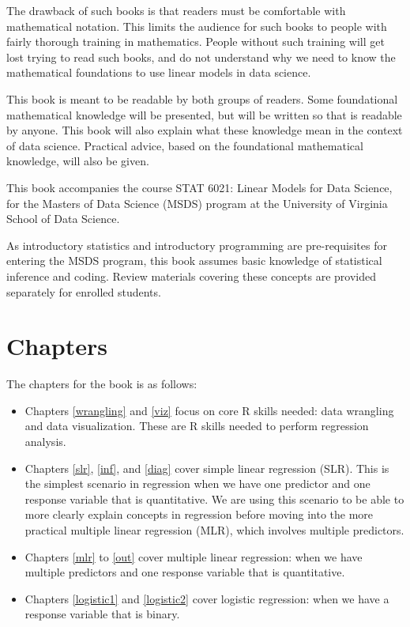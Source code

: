 \documentclass[
]{book}
\begin{document}
The drawback of such books is that readers must be comfortable with mathematical notation. This limits the audience for such books to people with fairly thorough training in mathematics. People without such training will get lost trying to read such books, and do not understand why we need to know the mathematical foundations to use linear models in data science.

This book is meant to be readable by both groups of readers. Some foundational mathematical knowledge will be presented, but will be written so that is readable by anyone. This book will also explain what these knowledge mean in the context of data science. Practical advice, based on the foundational mathematical knowledge, will also be given.

This book accompanies the course STAT 6021: Linear Models for Data Science, for the Masters of Data Science (MSDS) program at the University of Virginia School of Data Science.

As introductory statistics and introductory programming are pre-requisites for entering the MSDS program, this book assumes basic knowledge of statistical inference and coding. Review materials covering these concepts are provided separately for enrolled students.

\section*{Chapters}\label{chapters}

The chapters for the book is as follows:

\begin{itemize}
\item
  Chapters \ref{wrangling} and \ref{viz} focus on core R skills needed: data wrangling and data visualization. These are R skills needed to perform regression analysis.
\item
  Chapters \ref{slr}, \ref{inf}, and \ref{diag} cover simple linear regression (SLR). This is the simplest scenario in regression when we have one predictor and one response variable that is quantitative. We are using this scenario to be able to more clearly explain concepts in regression before moving into the more practical multiple linear regression (MLR), which involves multiple predictors.
\item
  Chapters \ref{mlr} to \ref{out} cover multiple linear regression: when we have multiple predictors and one response variable that is quantitative.
\item
  Chapters \ref{logistic1} and \ref{logistic2} cover logistic regression: when we have a response variable that is binary.
\end{itemize}
\end{document}
